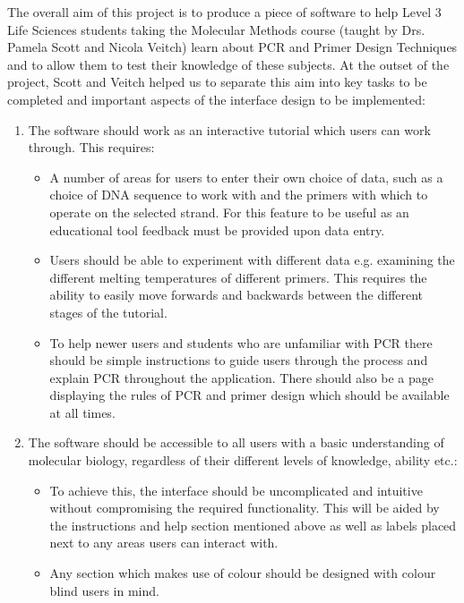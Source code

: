 The overall aim of this project is to produce a piece of software to help Level 3 Life Sciences students taking the Molecular Methods course (taught by Drs. Pamela Scott and Nicola Veitch) learn about PCR and Primer Design Techniques and to allow them to test their knowledge of these subjects. At the outset of the project, Scott and Veitch helped us to separate this aim into key tasks to be completed and important aspects of the interface design to be implemented:

\begin {enumerate}

\item The software should work as an interactive tutorial which users can work through. This requires:

\begin {itemize}
\item A number of areas for users to enter their own choice of data, such as a choice of DNA sequence to work with and the primers with which to operate on the selected strand. For this feature to be useful as an educational tool feedback must be provided upon data entry.
\item Users should be able to experiment with different data e.g. examining the different melting temperatures of different primers. This requires the ability to easily move forwards and backwards between the different stages of the tutorial.
\item To help newer users and students who are unfamiliar with PCR there should be simple instructions to guide users through the process and explain PCR throughout the application. There should also be a page displaying the rules of PCR and primer design which should be available at all times.
\end {itemize}

\item The software should be accessible to all users with a basic understanding of molecular biology, regardless of their different levels of knowledge, ability etc.:

\begin {itemize}
\item To achieve this, the interface should be uncomplicated and intuitive without compromising the required functionality. This will be aided by the instructions and help section mentioned above as well as labels placed next to any areas users can interact with.
\item Any section which makes use of colour should be designed with colour blind users in mind.
\end {itemize}


\end{enumerate}
